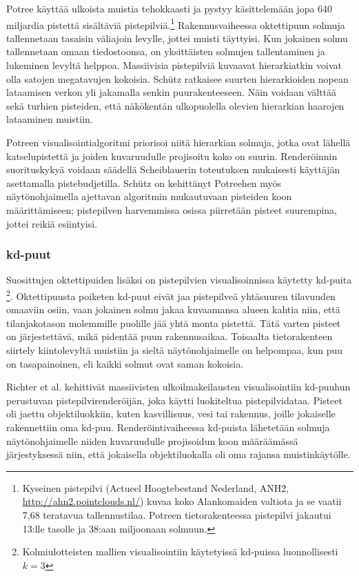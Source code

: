 Potree käyttää ulkoista muistia tehokkaasti ja pystyy käsittelemään jopa 640 miljardia pistettä sisältäviä pistepilviä.\footnote{Kyseinen pistepilvi (Actueel Hoogtebestand Nederland, ANH2, \url{http://ahn2.pointclouds.nl/}) kuvaa koko Alankomaiden valtiota ja se vaatii 7,68 teratavua tallennustilaa. Potreen tietorakenteessa pistepilvi jakautui 13:lle tasolle ja 38:aan miljoonaan solmuun.} Rakennusvaiheessa oktettipuun solmuja tallennetaan tasaisin väliajoin levylle, jottei muisti täyttyisi. Kun jokainen solmu tallennetaan omaan tiedostoonsa, on yksittäisten solmujen tallentaminen ja lukeminen levyltä helppoa. Massiivisia pistepilviä kuvaavat hierarkiatkin voivat olla satojen megatavujen kokoisia. Schütz ratkaisee suurten hierarkioiden nopean lataamisen verkon yli jakamalla senkin puurakenteeseen. Näin voidaan välttää sekä turhien pisteiden, että näkökentän ulkopuolella olevien hierarkian haarojen lataaminen muistiin. \cite{potree}

Potreen visualisointialgoritmi priorisoi niitä hierarkian solmuja, jotka ovat lähellä katselupistettä ja joiden kuvaruudulle projisoitu koko on suurin. Renderöinnin suorituskykyä voidaan säädellä Scheiblauerin toteutuksen mukaisesti käyttäjän asettamalla pistebudjetilla. Schütz on kehittänyt Potreehen myös näytönohjaimella ajettavan algoritmin mukautuvaan pisteiden koon määrittämiseen; pistepilven harvemmissa osissa piirretään pisteet suurempina, jottei reikiä esiintyisi. \cite{potree}

\subsubsection{kd-puut}
Suosittujen oktettipuiden lisäksi on pistepilvien visualisoinnissa käytetty kd-puita \footnote{Kolmiulotteisten mallien visualisointiin käytetyissä kd-puissa luonnollisesti $k=3$}. Oktettipuusta poiketen kd-puut eivät jaa pistepilveä yhtäsuuren tilavuuden omaaviin osiin, vaan jokainen solmu jakaa kuvaamansa alueen kahtia niin, että tilanjakotason molemmille puolille jää yhtä monta pistettä. Tätä varten pisteet on järjestettävä, mikä pidentää puun rakennusaikaa. Toisaalta tietorakenteen siirtely kiintolevyltä muistiin ja sieltä näytönohjaimelle on helpompaa, kun puu on tasapainoinen, eli kaikki solmut ovat saman kokoisia. \cite{richter}

Richter et al. kehittivät massiivisten ulkoilmakeilausten visualisointiin kd-puuhun perustuvan pistepilvirenderöijän, joka käytti luokiteltua pistepilvidataa. Pisteet oli jaettu objektiluokkiin, kuten kasvillisuus, vesi tai rakennus, joille jokaiselle rakennettiin oma kd-puu. Renderöintivaiheessa kd-puista lähetetään solmuja näytönohjaimelle niiden kuvaruudulle projisoidun koon määräämässä järjestyksessä niin, että jokaisella objektiluokalla oli oma rajansa muistinkäytölle. \cite{richter}

